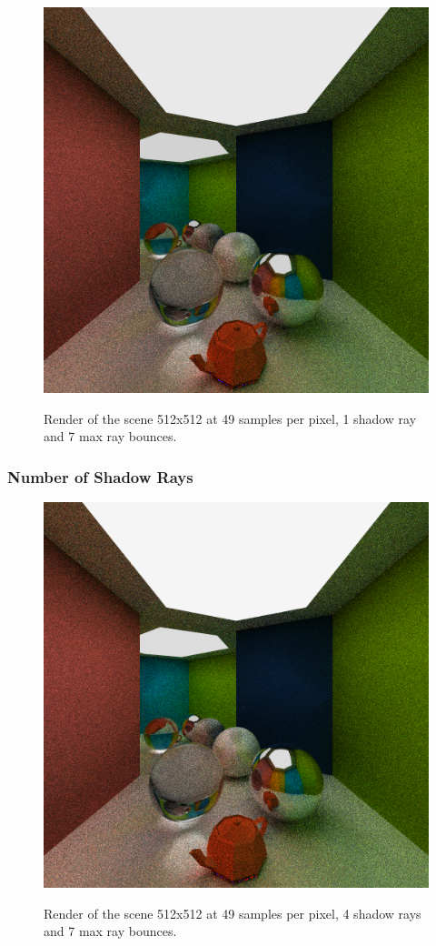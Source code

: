 \documentclass[a4paper, twocolumn]{article}
\begin{document}
            \begin{figure}[H]
                \centering
                \caption{Render of the scene 512x512 at 49 samples per pixel, 1 shadow ray and 7 max ray bounces.}
                \includegraphics[width=0.8\linewidth]{share/results/default.png}
                \label{fig:default}
            \end{figure}

            \subsubsection*{Number of Shadow Rays}

            \begin{figure}[H]
                \centering
                \caption{Render of the scene 512x512 at 49 samples per pixel, 4 shadow rays and 7 max ray bounces.}
                \includegraphics[width=0.8\linewidth]{share/results/shadow_rays_4.png}
                \label{fig:shadow_rays_4}
            \end{figure}
\end{document}
